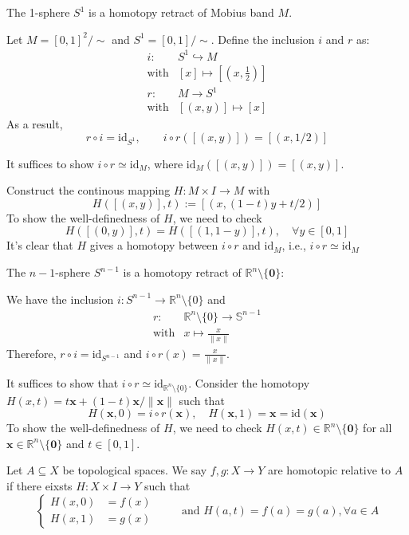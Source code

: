 \begin{example}
The 1-sphere $S^1$ is a homotopy retract of Mobius band $M$.

Let $M=[0,1]^2/\sim$ and $S^1=[0,1]/\sim$.
Define the inclusion $i$ and $r$ as:
\[
\begin{array}{ll}
i:&S^1\hookrightarrow M\\
\text{with}&[x]\mapsto [(x,\frac{1}{2})]
\end{array}
\]
\[
\begin{array}{ll}
r:&M\to S^1\\
\text{with}&[(x,y)]\mapsto[x]
\end{array}
\]
As a result, 
\[
r\circ i = \text{id}_{S^1},\qquad
i\circ r([(x,y)]) = [(x,1/2)]
\]

It suffices to show $i\circ r\simeq\text{id}_{M}$, where $\text{id}_M([(x,y)]) = [(x,y)]$.

Construct the continous mapping $H:M\times I\to M$ with
\[
H([(x,y)],t):=[(x,(1-t)y+t/2)]
\]
To show the well-definedness of $H$, we need to check 
\[
H([(0,y)],t)=H([(1,1-y)],t),\quad \forall y\in[0,1]
\]
It's clear that $H$ gives a homotopy between $i\circ r$ and $\text{id}_{M}$, i.e., $i\circ r\simeq\text{id}_M$
\end{example}
\begin{example}
The $n-1$-sphere $S^{n-1}$ is a homotopy retract of $\mathbb{R}^n\setminus\{\bm0\}$:

We have the inclusion $i: S^{n-1}\to\mathbb{R}^n\setminus\{0\}$ and
\[
\begin{array}{ll}
r:&\mathbb{R}^n\setminus\{0\}\to \mathbb{S}^{n-1}\\
\text{with}&x\mapsto\frac{x}{\|x\|}
\end{array}
\]
Therefore, $r\circ i=\text{id}_{S^{n-1}}$ and $i\circ r(x)= \frac{x}{\|x\|}$.

It suffices to show that $i\circ r\simeq\text{id}_{\mathbb{R}^n\setminus\{0\}}$.
Consider the homotopy $H(x,t)=t\bm x+(1-t)\bm x/\|\bm x\|$ such that 
\[
H(\bm x,0)=i\circ r(\bm x),\quad
H(\bm x,1)=\bm x=\text{id}(\bm x)
\]
To show the well-definedness of $H$, we need to check $H(x,t)\in\mathbb{R}^n\setminus\{\bm0\}$ for all $\bm x\in\mathbb{R}^n\setminus\{\bm0\}$ and $t\in[0,1]$.
\end{example}


\begin{definition}
Let $A\subseteq X$ be topological spaces.
We say $f,g:X\to Y$ are homotopic relative to $A$ if there eixsts $H:X\times I\to Y$ such that
\[
\left\{
\begin{aligned}
H(x,0)&=f(x)\\
H(x,1)&=g(x)
\end{aligned}
\right.
\qquad
\text{ and }
H(a,t)=f(a)=g(a),\forall a\in A
\]
\end{definition}

